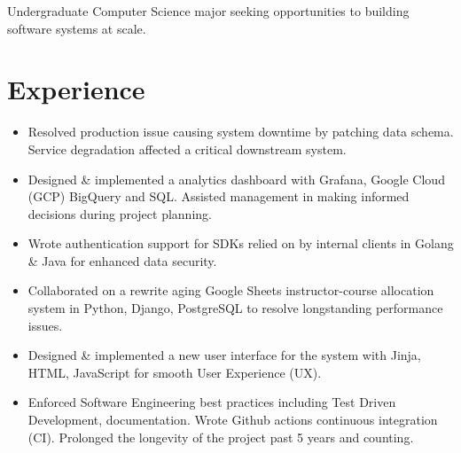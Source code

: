 %
%


\fancyhead{} %


Undergraduate Computer Science major seeking opportunities to building software systems at scale.

\section{Experience}
\begin{itemize}
    \item Resolved production issue causing system downtime by patching data schema. Service degradation affected a critical downstream system.
    \item 
        Designed \& implemented a analytics dashboard with Grafana, Google Cloud (GCP) BigQuery and SQL. Assisted management in making informed decisions during project planning.
    \item Wrote authentication support for SDKs relied on by internal clients in Golang \& Java for enhanced data security.
\end{itemize}

\begin{itemize}
  \item Collaborated on a rewrite aging Google Sheets instructor-course allocation system in Python, Django, PostgreSQL to 
    resolve longstanding performance issues. 
  \item Designed \& implemented a new user interface 
    for the system with Jinja, HTML, JavaScript for smooth User Experience (UX).
  \item Enforced Software Engineering best practices including Test Driven Development,
    documentation. Wrote Github actions continuous integration (CI). 
    Prolonged the longevity of the project past 5 years and counting.
\end{itemize}


